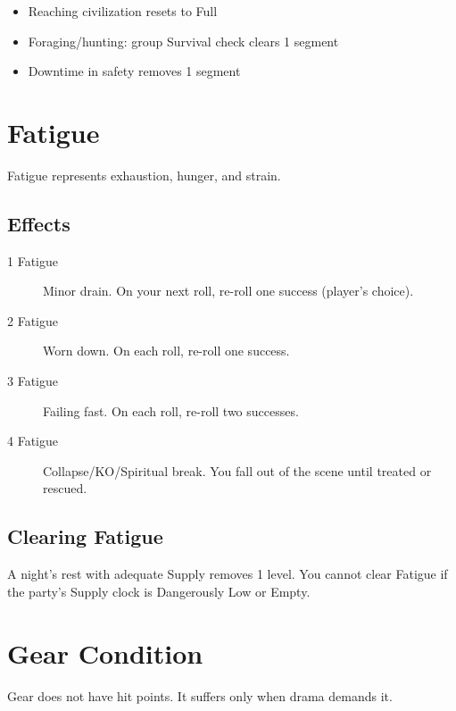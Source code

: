 \begin{itemize}
\item Reaching civilization resets to Full
\item Foraging/hunting: group Survival check clears 1 segment
\item Downtime in safety removes 1 segment
\end{itemize}

\section{Fatigue}

Fatigue represents exhaustion, hunger, and strain.

\subsection{Effects}

\begin{description}
\item[1 Fatigue] Minor drain. On your next roll, re-roll one success (player's choice).
\item[2 Fatigue] Worn down. On each roll, re-roll one success.
\item[3 Fatigue] Failing fast. On each roll, re-roll two successes.
\item[4 Fatigue] Collapse/KO/Spiritual break. You fall out of the scene until treated or rescued.
\end{description}

\subsection{Clearing Fatigue}

A night's rest with adequate Supply removes 1 level. You cannot clear Fatigue if the party's Supply clock is Dangerously Low or Empty.

\section{Gear Condition}

Gear does not have hit points. It suffers only when drama demands it.

